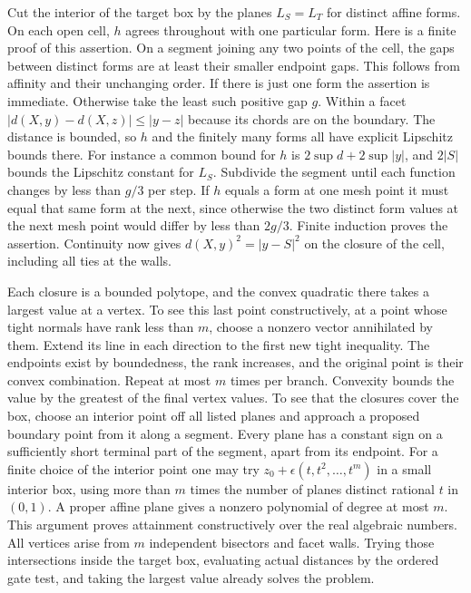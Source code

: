 \documentclass[10pt,letterpaper]{article}
\begin{document}
Cut the interior of the target box by the planes $L_S=L_T$ for distinct
affine forms. On each open cell, $h$ agrees throughout with one particular
form. Here is a finite proof of this assertion. On a segment joining any two
points of the cell, the gaps between distinct forms are at least their
smaller endpoint gaps. This follows from affinity and their unchanging order.
If there is just one form the assertion is immediate. Otherwise take the
least such positive gap $g$. Within a facet $|d(X,y)-d(X,z)|\le |y-z|$
because its chords are on the boundary. The distance is bounded, so $h$
and the finitely many forms all have explicit Lipschitz bounds there. For
instance a common bound for $h$ is $2\sup d+2\sup |y|$, and $2|S|$ bounds
the Lipschitz constant for $L_S$. Subdivide the segment until each function
changes by less than $g/3$ per step. If $h$ equals a form at one mesh
point it must equal that same form at the next, since otherwise the two distinct
form values at the next mesh point would differ by less than $2g/3$.
Finite induction proves the assertion. Continuity now gives
$d(X,y)^2=|y-S|^2$ on the closure of the cell, including all ties at
the walls.

Each closure is a bounded polytope, and the convex quadratic there takes
a largest value at a vertex. To see this last point constructively, at a
point whose tight normals have rank less than $m$, choose a nonzero vector
annihilated by them. Extend its line in each direction to the first new tight
inequality. The endpoints exist by boundedness, the rank increases, and the
original point is their convex combination. Repeat at most $m$ times per
branch. Convexity bounds the value by the greatest of the final vertex
values. To see that the closures cover the box, choose an interior point off all
listed planes and approach a proposed boundary point from it along a segment. Every plane has a constant sign on a sufficiently short terminal
part of the segment, apart from its endpoint. For a finite choice of the
interior point one may try $z_0+\epsilon(t,t^2,\ldots,t^m)$ in a small
interior box, using more than $m$ times the number of planes distinct
rational $t$ in $(0,1)$. A proper affine plane gives a nonzero polynomial
of degree at most $m$. This argument proves attainment constructively over
the real algebraic numbers. All vertices arise from $m$ independent
bisectors and facet walls. Trying those intersections inside the target
box, evaluating actual distances by the ordered gate test, and taking the
largest value already solves the problem.
\end{document}

